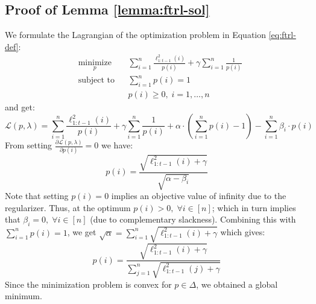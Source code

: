 \subsection{ Proof of Lemma \ref{lemma:ftrl-sol}}
\begin{proofarg}{}
We formulate the Lagrangian of the optimization problem in Equation \eqref{eq:ftrl-def}:
\begin{equation*}
\begin{aligned}
& \underset{p}{\text{minimize}}
& &  \sum_{i=1}^n \frac{\ell_{1:t-1}^2(i)}{p(i)}  + \gamma \sum_{i=1}^n \frac{1}{p(i)} \\
& \text{subject to}
& & \sum_{i=1}^n p(i)=1\\ 
& & &p(i) \geq 0, \; i = 1, \ldots, n
\end{aligned}
\end{equation*}
and get:
\begin{equation*}
\mathcal{L}(p, \lambda) = \sum_{i=1}^n \frac{\ell_{1:t-1}^2(i)}{p(i)} + \gamma \sum_{i=1}^n \frac{1}{p(i)} + \alpha \cdot \left(\sum_{i=1}^n p(i) - 1 \right) -\sum_{i=1}^n \beta_i \cdot p(i)
\end{equation*}
From setting $\frac{\partial \mathcal{L}(p, \lambda)}{\partial p(i)}=0 $ we have:
\begin{equation}
p(i) = \frac{\sqrt{\ell_{1:t-1}^2(i)+\gamma}}{\sqrt{\alpha - \beta_i}}
\end{equation}
Note that setting $p(i)=0$ implies an objective value of infinity due to the regularizer. Thus, at the optimum $p(i)>0,\; \forall i\in[n]$;
 which in turn implies that  $\beta_i=0,\; \forall i\in[n]$ (due to complementary slackness).
Combining this with $\sum_{i=1}^n p(i)=1$, we get $\sqrt{\alpha} = \sum_{i=1}^n \sqrt{\ell_{1:t-1}^2(i)+\gamma} $ which gives:
\begin{equation}
p(i) = \frac{\sqrt{\ell_{1:t-1}^2(i)+\gamma}}{ \sum_{j=1}^n \sqrt{\ell_{1:t-1}^2(j)+\gamma} }
\end{equation}
Since the minimization problem is convex for $p\in \Delta$, we obtained a global minimum.
\end{proofarg}

